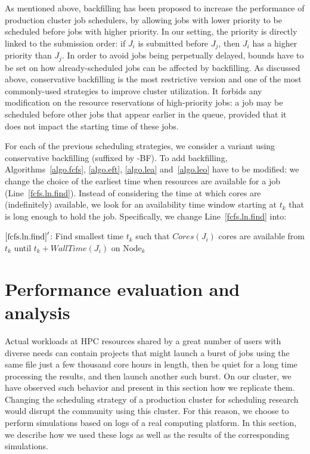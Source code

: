 \documentclass[conference]{IEEEtran}
\newcommand{\Node}[1]{\ensuremath{\mathrm{Node}_{#1}}\xspace}
\newcommand{\core}{\mathit{Cores}\xspace}
\newcommand{\walltime}{\mathit{WallTime}\xspace}
\begin{document}
As mentioned above, backfilling has been proposed to increase the
performance of production cluster job schedulers, by allowing jobs with lower priority to be
scheduled before jobs with higher priority. In our setting, the
priority is directly linked to the submission order: if $J_i$ is
submitted before $J_j$, then $J_i$ has a higher priority than $J_j$.
In order to avoid jobs
being perpetually delayed, bounds have to be set on how already-scheduled
jobs can be affected by backfilling. As discussed above,
conservative backfilling is the most restrictive version and one of
the most commonly-used strategies to improve cluster utilization. It
forbids any modification on the resource
reservations of high-priority jobs: a job may be scheduled
before other jobs that appear earlier in the queue, provided that it
does not impact the starting time of these jobs.


For each of the previous scheduling strategies, we consider a variant
using conservative backfilling (suffixed by -BF). To add
backfilling, Algorithms~\ref{algo.fcfs}, \ref{algo.eft},
\ref{algo.lea} and~\ref{algo.leo} have to be modified: we change the
choice of the earliest time when resources are available for a job
(Line~\ref{fcfs.ln.find}). Instead of considering the time at which
cores are (indefinitely) available, we look for an availability time
window starting at $t_k$ that is long enough to hold the
job. Specifically, we change Line~\ref{fcfs.ln.find} into:
\begin{algorithmic}[0]
  \State $\ref{fcfs.ln.find}'$: Find smallest time $t_k$ such that $\core(J_i)$ cores are
  available from $t_k$ until $t_k + \walltime(J_i)$ on $\Node{k}$
\end{algorithmic}


\section{Performance evaluation and analysis}\label{sec.evaluations}

Actual workloads at HPC resources shared by a great number of users with diverse needs can contain 
projects that might launch a burst of jobs using the same file just a few thousand
core hours in length, then be quiet for a long time processing the results, and then launch another such burst.
On our cluster, we have observed such behavior and present in this section how we replicate them.
Changing the scheduling strategy of a production cluster for
scheduling research would disrupt the community using this cluster.
For this reason, we choose to perform simulations based on logs of a
real computing platform. In this section, we describe how we used
these logs as well as the results of the corresponding simulations.
\end{document}
